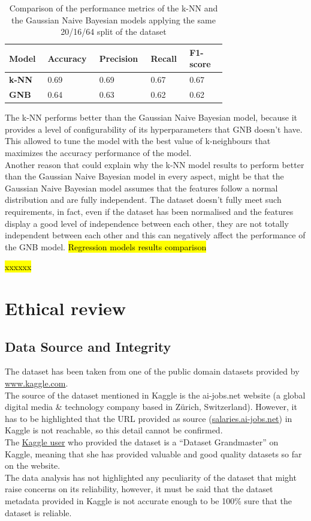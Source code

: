 \documentclass[11pt,a4paper]{article}
\newcommand{\hint}[1]{%
  \begingroup
  \sethlcolor{yellow!30}%
  \hl{#1}%
  \endgroup
}
\begin{document}
\begin{table}
\centering
\begin{tabular}{p{0.12\linewidth}|p{0.15\linewidth}|p{0.15\linewidth}|p{0.15\linewidth}|p{0.15\linewidth}} \hline
\textbf{Model}&\textbf{Accuracy}&\textbf{Precision}&\textbf{Recall}&\textbf{F1-score}\\ \hline
\textbf{k-NN}&0.69&0.69&0.67&0.67\\
\textbf{GNB}&0.64&0.63&0.62&0.62\\
\hline\end{tabular}
\caption{Comparison of the performance metrics of the k-NN and the Gaussian Naive Bayesian models applying the same 20/16/64 split of the dataset}
\label{tab:Comparison of the performance metrics of the k-NN and the Gaussian Naive Bayesian models}
\end{table}
The k-NN performs better than the Gaussian Naive Bayesian model, because it provides a level of configurability of its hyperparameters that GNB doesn’t have. This allowed to tune the model with the best value of k-neighbours that maximizes the accuracy performance of the model.
\\
Another reason that could explain why the k-NN model results to perform better than the Gaussian Naive Bayesian model in every aspect, might be that the Gaussian Naive Bayesian model assumes that the features follow a normal distribution and are fully independent. The dataset doesn’t fully meet such requirements, in fact, even if the dataset has been normalised and the features display a good level of independence between each other, they are not totally independent between each other and this can negatively affect the performance of the GNB model.
\hint{Regression models results comparison}
\hint{xxxxxx}


\section{Ethical review}
\subsection{Data Source and Integrity}
The dataset has been taken from one of the public domain datasets provided by \href{https://www.kaggle.com/datasets/ruchi798/data-science-job-salaries}{www.kaggle.com}.\\
The source of the dataset mentioned in Kaggle is the ai-jobs.net website (a global digital media \& technology company based in Zürich, Switzerland). However, it has to be highlighted that the URL provided as source (\href{https://salaries.ai-jobs.net/}{salaries.ai-jobs.net}) in Kaggle is not reachable, so this detail cannot be confirmed.\\
The \href{https://www.kaggle.com/ruchi798/datasets}{Kaggle user} who provided the dataset is a “Dataset Grandmaster” on Kaggle, meaning that she has provided valuable and good quality datasets so far on the website.\\
The data analysis has not highlighted any peculiarity of the dataset that might raise concerns on its reliability, however, it must be said that the dataset metadata provided in Kaggle is not accurate enough to be 100\% sure that the dataset is reliable.
\end{document}
